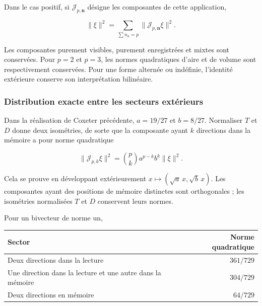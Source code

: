 Dans le cas positif, si
\(\mathcal J_{p,\mathbf n}\) désigne les composantes de cette application,



\begin{equation}
\boxed{\|\xi\|^2=\sum_{\sum n_a=p}
\|\mathcal J_{p,\mathbf n}\xi\|^2.}
\label{nuc11:eq:21}
\end{equation}



Les composantes purement visibles, purement
enregistrées et mixtes sont conservées.
Pour \(p=2\) et \(p=3\), les normes
quadratiques d’aire et de volume sont respectivement conservées.
Pour une forme alternée ou indéfinie, l’identité extérieure
conserve son interprétation bilinéaire.

\subsubsection{Distribution exacte entre les secteurs extérieurs}

Dans la réalisation de Coxeter précédente,
\(a=19/27\) et \(b=8/27\).
Normaliser \(T\) et \(D\) donne deux isométries, de sorte que la
composante ayant \(k\) directions dans la mémoire a pour norme quadratique




\begin{equation}
\boxed{
\|\mathcal J_{p,k}\xi\|^2=
\binom pk a^{p-k}b^k\|\xi\|^2.
}
\label{nuc11:eq:22}
\end{equation}



Cela se prouve en développant extérieurement
\(x\mapsto(\sqrt a\,x,\sqrt b\,x)\).
Les composantes ayant des positions de mémoire distinctes sont
orthogonales ; les isométries normalisées \(T\) et \(D\)
conservent leurs normes.

Pour un bivecteur de norme un,

\begin{center}
\begin{tabular}{@{}lr@{}}
\toprule
Sector & Norme quadratique
\\
\midrule
Deux directions dans la lecture & \(361/729\)\\
Une direction dans la lecture et une autre dans la mémoire & \(304/729\)\\
Deux directions en mémoire
 & \(64/729\)\\
\bottomrule
\end{tabular}
\end{center}

